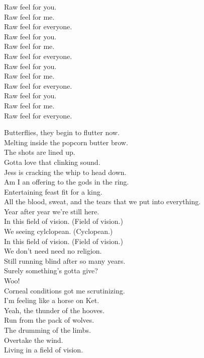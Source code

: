 Raw feel for you. \\
Raw feel for me. \\
Raw feel for everyone. \\
Raw feel for you. \\
Raw feel for me. \\
Raw feel for everyone. \\
Raw feel for you. \\
Raw feel for me. \\
Raw feel for everyone. \\
Raw feel for you. \\
Raw feel for me. \\
Raw feel for everyone. \\



Butterflies, they begin to flutter now. \\
Melting inside the popcorn butter brow. \\
The shots are lined up. \\
Gotta love that clinking sound. \\
Jess is cracking the whip to head down. \\

Am I an offering to the gods in the ring. \\
Entertaining feast fit for a king. \\
All the blood, sweat, and the tears that we put into everything. \\
Year after year we're still here. \\

In this field of vision. (Field of vision.) \\
We seeing cylclopean. (Cyclopean.) \\
In this field of vision. (Field of vision.) \\
We don't need need no religion. \\

Still running blind after so many years. \\
Surely something's gotta give? \\
Woo! \\
Corneal conditions got me scrutinizing. \\
I'm feeling like a horse on Ket. \\
Yeah, the thunder of the hooves. \\
Run from the pack of wolves. \\
The drumming of the limbs. \\
Overtake the wind. \\
Living in a field of vision. \\

